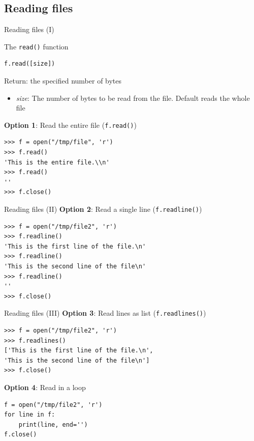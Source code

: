 \documentclass[10pt,compress]{beamer} %
\begin{document}
\subsection{Reading files}
\begin{frame}[fragile]{Reading files (I)}
	\begin{block}{The \texttt{read()} function}
	\vspace{-0.2cm}
\begin{verbatim}
f.read([size])
\end{verbatim}

	\vspace{-0.2cm}
	Return: the specified number of bytes
	\begin{itemize}
	\item \textit{size}: The number of bytes to be read from the file. Default reads the whole file
	\end{itemize}
	\end{block}
\textbf{Option 1}: Read the entire file (\texttt{f.read()})
\begin{verbatim}
>>> f = open("/tmp/file", 'r')
>>> f.read()
'This is the entire file.\\n'
>>> f.read()
''
>>> f.close()
\end{verbatim}
	
\end{frame}

\begin{frame}[fragile]{Reading files (II)}
	\textbf{Option 2}: Read a single line (\texttt{f.readline()})
\begin{verbatim}
>>> f = open("/tmp/file2", 'r')
>>> f.readline()
'This is the first line of the file.\n'
>>> f.readline()
'This is the second line of the file\n'
>>> f.readline()
''
>>> f.close()
\end{verbatim}

\end{frame}

\begin{frame}[fragile]{Reading files (III)}
	\textbf{Option 3}: Read lines as list (\texttt{f.readlines()})
\begin{verbatim}
>>> f = open("/tmp/file2", 'r')
>>> f.readlines()
['This is the first line of the file.\n',
'This is the second line of the file\n']
>>> f.close()
\end{verbatim}

	\textbf{Option 4}: Read in a loop
\begin{verbatim}
f = open("/tmp/file2", 'r')
for line in f:
    print(line, end='')
f.close()
\end{verbatim}
\end{frame}
\end{document}
